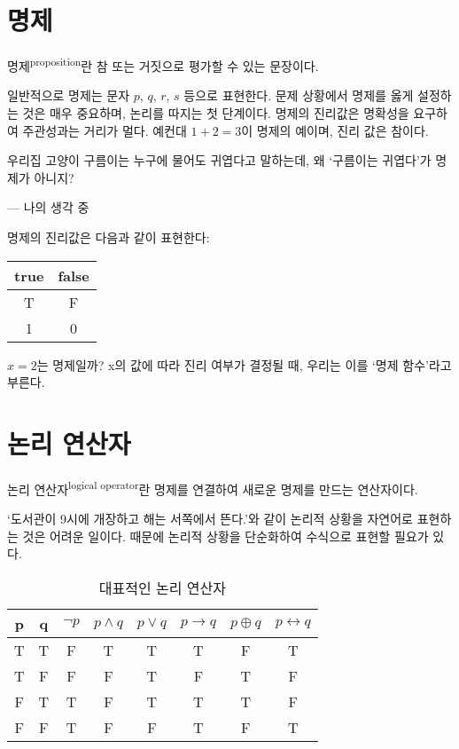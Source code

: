\documentclass[../note.tex]{subfiles}
\begin{document}
\section{명제}
\begin{definition}[명제]
  명제\textsuperscript{proposition}란 참 또는 거짓으로 평가할 수 있는 문장이다.
\end{definition}
일반적으로 명제는 문자 $p$, $q$, $r$, $s$ 등으로 표현한다. 문제 상황에서 명제를 옳게 설정하는 것은 매우 중요하며, 논리를 따지는 첫 단계이다. 명제의 진리값은 명확성을 요구하여 주관성과는 거리가 멀다. 예컨대 $1+2=3$이 명제의 예이며, 진리 값은 참이다.

\epigraph{우리집 고양이 구름이는 누구에 물어도 귀엽다고 말하는데, 왜 `구름이는 귀엽다'가 명제가 아니지?}{--- 나의 생각 중}

명제의 진리값은 다음과 같이 표현한다:
\begin{table}[H]
  \centering
  \begin{tabular}{ c | c }
    true & false \\
    \hline
    T & F \\
    1 & 0
  \end{tabular}
\end{table}

$x=2$는 명제일까? x의 값에 따라 진리 여부가 결정될 때, 우리는 이를 `명제 함수'라고 부른다.

\section{논리 연산자}
\begin{definition}[논리 연산자]
  논리 연산자\textsuperscript{logical operator}란 명제를 연결하여 새로운 명제를 만드는 연산자이다.
\end{definition}

`도서관이 9시에 개장하고 해는 서쪽에서 뜬다.'와 같이 논리적 상황을 자연어로 표현하는 것은 어려운 일이다. 때문에 논리적 상황을 단순화하여 수식으로 표현할 필요가 있다.

\begin{table}[H]
  \centering
  \begin{tabular}{ c | c | c | c | c | c | c | c }
    p & q & $\neg p$ & $p \land q$ & $p \lor q$ & $p \rightarrow q$ & $p \oplus q$ & $p \longleftrightarrow q$ \\
    \hline
    T & T & F & T & T & T & F & T \\
    T & F & F & F & T & F & T & F \\
    F & T & T & F & T & T & T & F \\
    F & F & T & F & F & T & F & T
  \end{tabular}
  \caption{대표적인 논리 연산자}
  \label{table:logicnal-operator}
\end{table}
\end{document}
